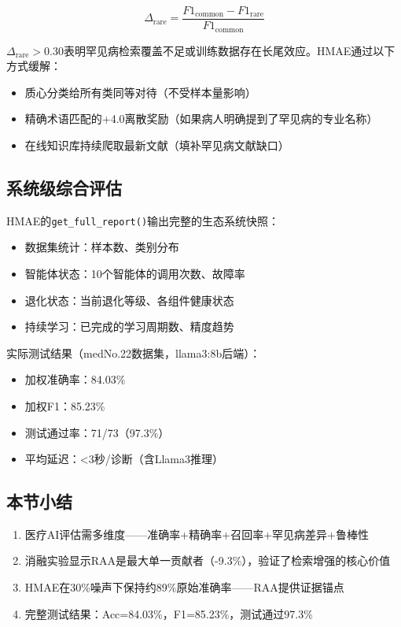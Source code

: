 \documentclass[11pt,a4paper]{ctexart}
\begin{document}
$$\Delta_{\text{rare}} = \frac{F1_{\text{common}} - F1_{\text{rare}}}{F1_{\text{common}}}$$

$\Delta_{\text{rare}} > 0.30$表明罕见病检索覆盖不足或训练数据存在长尾效应。HMAE通过以下方式缓解：
\begin{itemize}[nosep]
\item 质心分类给所有类同等对待（不受样本量影响）
\item 精确术语匹配的+4.0离散奖励（如果病人明确提到了罕见病的专业名称）
\item 在线知识库持续爬取最新文献（填补罕见病文献缺口）
\end{itemize}

\subsection{系统级综合评估}

HMAE的\texttt{get\_full\_report()}输出完整的生态系统快照：
\begin{itemize}[nosep]
\item 数据集统计：样本数、类别分布
\item 智能体状态：10个智能体的调用次数、故障率
\item 退化状态：当前退化等级、各组件健康状态
\item 持续学习：已完成的学习周期数、精度趋势
\end{itemize}

实际测试结果（medNo.22数据集，llama3:8b后端）：
\begin{itemize}[nosep]
\item 加权准确率：84.03\%
\item 加权F1：85.23\%
\item 测试通过率：71/73（97.3\%）
\item 平均延迟：<3秒/诊断（含Llama3推理）
\end{itemize}

\subsection{本节小结}

\begin{enumerate}[nosep]
\item 医疗AI评估需多维度——准确率+精确率+召回率+罕见病差异+鲁棒性
\item 消融实验显示RAA是最大单一贡献者（-9.3\%），验证了检索增强的核心价值
\item HMAE在30\%噪声下保持约89\%原始准确率——RAA提供证据锚点
\item 完整测试结果：Acc=84.03\%，F1=85.23\%，测试通过97.3\%
\end{enumerate}
\end{document}
